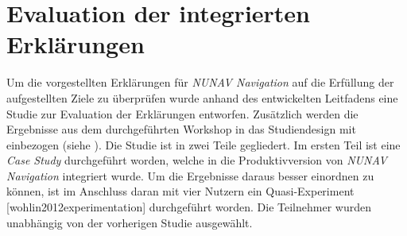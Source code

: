 \section{Evaluation der integrierten Erklärungen}
\label{sec:02_evaluation_explanations}

Um die vorgestellten Erklärungen für \textit{NUNAV Navigation} auf die Erfüllung der aufgestellten Ziele zu überprüfen wurde anhand des entwickelten Leitfadens eine Studie zur Evaluation der Erklärungen entworfen. Zusätzlich werden die Ergebnisse aus dem durchgeführten Workshop in das Studiendesign mit einbezogen (siehe ). Die Studie ist in zwei Teile gegliedert. Im ersten Teil ist eine \textit{Case Study} \cite{wohlin2012experimentation} durchgeführt worden, welche in die Produktivversion von \textit{NUNAV Navigation} integriert wurde. Um die Ergebnisse daraus besser einordnen zu können, ist im Anschluss daran mit vier Nutzern ein Quasi-Experiment [wohlin2012experimentation] durchgeführt worden. Die Teilnehmer wurden unabhängig von der vorherigen Studie ausgewählt.









